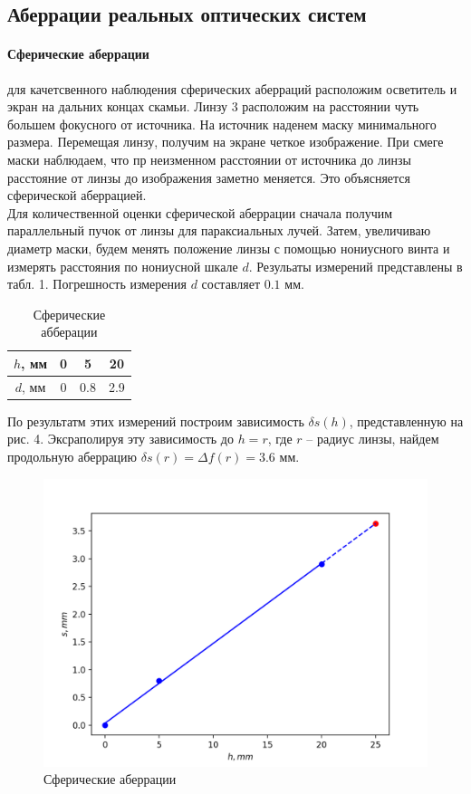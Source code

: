 \documentclass[a4paper,12pt]{article}
\begin{document}
\subsection*{Аберрации реальных оптических систем}
\paragraph{Сферические аберрации} для качетсвенного наблюдения сферических аберраций расположим осветитель и экран на дальних концах скамьи. Линзу 3 расположим на расстоянии чуть большем фокусного от источника. На источник наденем маску минимального размера. Перемещая линзу, получим на экране четкое изображение. При смеге маски наблюдаем, что пр неизменном расстоянии от источника до линзы расстояние от линзы до изображения заметно меняется. Это объясняется сферической аберрацией. \\
Для количественной оценки сферической аберрации сначала получим параллельный пучок от линзы для параксиальных лучей. Затем, увеличиваю диаметр маски, будем менять положение линзы с помощью нониусного винта и измерять расстояния по нониусной шкале $d$. Резульаты измерений представлены в табл. 1. Погрешность измерения $d$ составляет $0.1$ мм.

\begin{table}[H]
    \centering
    \caption{Сферические абберации}
    \begin{tabular}{|c|c|c|c|} \hline
        $h$, мм & 0 & 5 & 20 \\ \hline
        $d$, мм & 0 & 0.8 & 2.9 \\ \hline
    \end{tabular}
\end{table}

\noindent
По результатм этих измерений построим зависимость $\delta s(h)$, представленную на рис. 4. Эксраполируя эту зависимость до $h = r$, где $r$ -- радиус линзы, найдем продольную аберрацию $\delta s(r) = \Delta f(r) = 3.6$ мм.

\begin{figure}[H]
    \centering
    \includegraphics[scale=0.9]{1.png}
    \caption{Сферические аберрации}
\end{figure}
\end{document}
